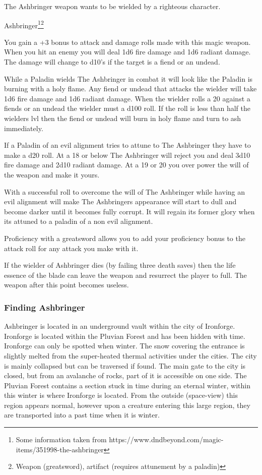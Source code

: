 The Ashbringer weapon wants to be wielded by a righteous character. 

\begin{commentbox}{Ashbringer\footnote{Some information taken from https://www.dndbeyond.com/magic-items/351998-the-ashbringer}\footnote{Weapon (greatsword), artifact (requires attunement by a paladin)}}{\tiny }
	
	
	You gain a +3 bonus to attack and damage rolls made with this magic weapon. When you hit an enemy you will deal 1d6 fire damage and 1d6 radiant damage. The damage will change to d10's if the target is a fiend or an undead.
	
	While a Paladin wields The Ashbringer in combat it will look like the Paladin is burning with a holy flame. Any fiend or undead that attacks the wielder will take 1d6 fire damage and 1d6 radiant damage. When the wielder rolls a 20 against a fiends or an undead the wielder must a d100 roll. If the roll is less than half the wielders lvl then the fiend or undead will burn in holy flame and turn to ash immediately.
	
	If a Paladin of an evil alignment tries to attune to The Ashbringer they have to make a d20 roll. At a 18 or below The Ashbringer will reject you and deal 3d10 fire damage and 2d10 radiant damage. At a 19 or 20 you over power the will of the weapon and make it yours.
	
	With a successful roll to overcome the will of The Ashbringer while having an evil alignment will make The Ashbringers appearance will start to dull and become darker until it becomes fully corrupt. It will regain its former glory when its attuned to a paladin of a non evil alignment.
	
	Proficiency with a greatsword allows you to add your proficiency bonus to the attack roll for any attack you make with it.
	
	If the wielder of Ashbringer dies (by failing three death saves) then the life essence of the blade can leave the weapon and resurrect the player to full. The weapon after this point becomes useless.
\end{commentbox}

\subsubsection{Finding Ashbringer}

Ashbringer is located in an underground vault within the city of Ironforge. Ironforge is located within the Pluvian Forest and has been hidden with time. Ironforge can only be spotted when winter. The snow covering the entrance is slightly melted from the super-heated thermal activities under the cities. The city is mainly collapsed but can be traversed if found. The main gate to the city is closed, but from an avalanche of rocks, part of it is accessible on one side. The Pluvian Forest contains a section stuck in time during an eternal winter, within this winter is where Ironforge is located. From the outside (space-view) this region appears normal, however upon a creature entering this large region, they are transported into a past time when it is winter. 

